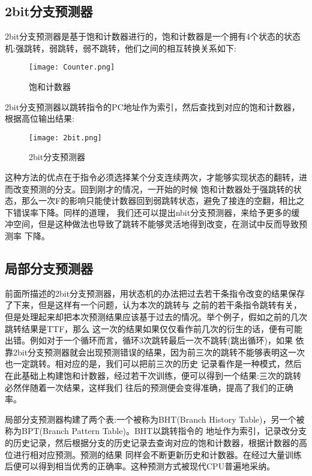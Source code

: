 \documentclass[forprint]{WHUBachelor}
\begin{document}
  
  
  
  \subsection{2bit分支预测器}
2bit分支预测器是基于饱和计数器进行的，饱和计数器是一个拥有4个状态的状态机:强跳转，弱跳转，弱不跳转，他们之间的相互转换关系如下:\par
\begin{figure}[ht]
  \centering
    \texttt{[image: Counter.png]}
    \caption{饱和计数器}
    \label{fig:1}
  \end{figure}
2bit分支预测器以跳转指令的PC地址作为索引，然后查找到对应的饱和计数器，根据高位输出结果:\par
\begin{figure}[ht]
  \centering
    \texttt{[image: 2bit.png]}
    \caption{2bit分支预测器}
    \label{fig:1}
  \end{figure}
这种方法的优点在于指令必须选择某个分支连续两次，才能够实现状态的翻转，进而改变预测的分支。回到刚才的情况，一开始的时候
饱和计数器处于强跳转的状态，那么一次F的影响只能使计数器回到弱跳转状态，避免了接连的空翻，相比之下错误率下降。同样的道理，
我们还可以提出nbit分支预测器，来给予更多的缓冲空间，但是这种做法也导致了跳转不能够灵活地得到改变，在测试中反而导致预测率
下降。

 \subsection{局部分支预测器}
 前面所描述的2bit分支预测器，用状态机的办法把过去若干条指令改变的结果保存了下来，但是这样有一个问题，认为本次的跳转与
 之前的若干条指令跳转有关，但是处理起来却把本次预测结果应该基于过去的情况。举个例子，假如之前的几次跳转结果是TTF，那么
 这一次的结果如果仅仅看作前几次的衍生的话，便有可能出错。例如对于一个循环而言，循环3次跳转最后一次不跳转(跳出循环)，如果
 依靠2bit分支预测器就会出现预测错误的结果，因为前三次的跳转不能够表明这一次也一定跳转。相对应的是，我们可以把前三次的历史
 记录看作是一种模式，然后在此基础上构建饱和计数器，经过若干次训练，便可以得到一个结果:三次的跳转必然伴随着一次结果，这样我们
 往后的预测便会变得准确，提高了我们的正确率。\par
 局部分支预测器构建了两个表:一个被称为BHT(Branch History Table)，另一个被称为BPT(Branch Pattern Table)。BHT以跳转指令的
 地址作为索引，记录改分支的历史记录，然后根据分支的历史记录去查询对应的饱和计数器，根据计数器的高位进行相对应预测。预测的结果
 同样会不断更新历史和计数器。在经过大量训练后便可以得到相当优秀的正确率。这种预测方式被现代CPU普遍地采纳。
\end{document}
